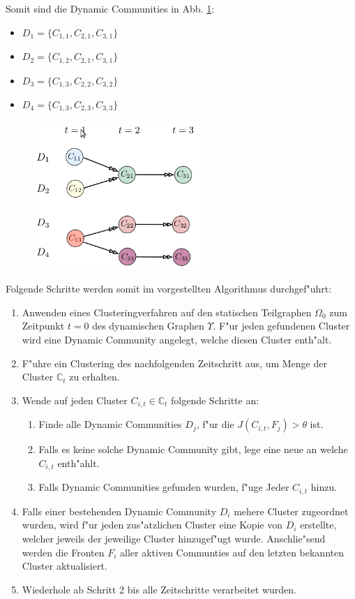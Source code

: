 \documentclass[journal]{vgtc}
\begin{document}
    Somit sind die Dynamic Communities in Abb. \ref{fig:dynamic2}:
    \begin{itemize}
      \item $D_1 =\{C_{1,1}, C_{2,1}, C_{3,1}\}$
      \item $D_2 =\{C_{1,2}, C_{2,1}, C_{3,1}\}$
      \item $D_3 =\{C_{1,3}, C_{2,2}, C_{3,2}\}$
      \item $D_4 =\{C_{1,3},C_{2,3}, C_{3,3}\}$
    \end{itemize}

    
    \begin{figure}[b]
      \centering
      \includegraphics[width=2.5in]{images/dynamic_communities2}
      \caption{\label{fig:dynamic2} \cite{timestep}}
    \end{figure}
    Folgende Schritte werden somit im \cite{timestep} vorgestellten Algorithmus durchgef"uhrt:
    \begin{enumerate}
      \item Anwenden eines Clusteringverfahren auf den statischen Teilgraphen $\Omega_0$ zum Zeitpunkt $t=0$ des dynamischen Graphen $\Upsilon$. F"ur jeden gefundenen
	    Cluster wird eine Dynamic Community angelegt, welche diesen Cluster enth"alt.
      \item F"uhre ein Clustering des nachfolgenden Zeitschritt aus, um Menge der Cluster $\mathbb{C}_t$ zu erhalten.
      \item Wende auf jeden Cluster $C_{i,t} \in \mathbb{C}_t$ folgende Schritte an:
      \begin{enumerate}
	\item Finde alle Dynamic Communities $D_j$, f"ur die $J(C_{i,t},F_j) > \theta$ ist.
	\item Falls es keine solche Dynamic Community gibt, lege eine neue an welche $C_{i,t}$ enth"ahlt.
	\item Falls Dynamic Communities gefunden wurden, f"uge Jeder $C_{i,t}$ hinzu.
      \end{enumerate}
      \item Falls einer bestehenden Dynamic Community $D_i$ mehere Cluster zugeordnet wurden, wird f"ur jeden zus"atzlichen Cluster eine Kopie von $D_i$ erstellte,
	    welcher jeweils der jeweilige Cluster hinzugef"ugt wurde.
	    Anschlie"send werden die Fronten $F_i$ aller aktiven Communties auf den letzten bekannten Cluster aktualisiert.
      \item Wiederhole ab Schritt 2 bis alle Zeitschritte verarbeitet wurden.
    \end{enumerate}
\end{document}
